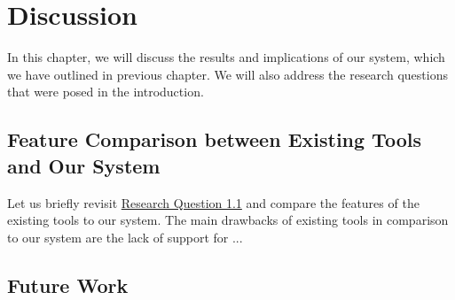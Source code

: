 \documentclass[../paper.tex]{subfiles}
\begin{document}
    \section{Discussion}\label{ch:discussion}
    In this chapter, we will discuss the results and implications of our system, which we have outlined in previous chapter. We will also address the research questions that were posed in the introduction.

    \subsection{Feature Comparison between Existing Tools and Our System}\label{sec:feature-comparison}
    Let us briefly revisit \href{RQ1.1}{Research Question 1.1} and compare the features of the existing tools to our system. The main drawbacks of existing tools in comparison to our system are the lack of support for ...
    \lipsum[1]

    \subsection{Future Work}\label{sec:future-work}

    \ifSubfilesClassLoaded{%
        \printbibliography{}%
    }{}
\end{document}
